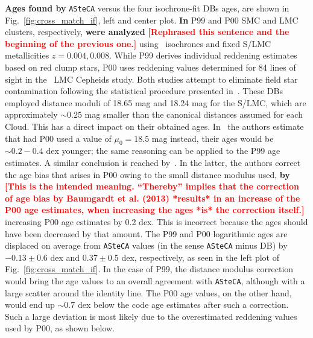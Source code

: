 \documentclass[draft]{aa}
\newcommand{\LEt}[1]{\textcolor{red}{\textbf{[#1]}}}
\begin{document}
%
%
\textbf{Ages found by} \texttt{ASteCA} versus the four isochrone-fit DBs ages,
are shown in Fig.~\ref{fig:cross_match_if}, left and center plot.
%
\textbf{In} P99 and P00 SMC and LMC clusters, respectively, \textbf{were
analyzed} \LEt{Rephrased this sentence and the beginning of the previous one.}
using~\cite{Bertelli_1994} isochrones and fixed S/LMC metallicities
$z{=}0.004, 0.008$. While P99 derives individual reddening estimates based on
red clump stars, P00 uses reddening values determined for 84 lines of sight
in the~\cite{Udalski_1999} LMC Cepheids study.
%
Both studies attempt to eliminate field star contamination following the
statistical procedure presented in~\cite{Mateo_1986}.
These DBs employed distance moduli of 18.65 mag and 18.24 mag for the S/LMC,
which are approximately ${\sim}0.25$ mag smaller than the canonical distances
assumed for each Cloud. This has a direct impact on their obtained ages.
%
In~\cite{de_Grijs_2006} the authors estimate that had P00 used a value
of $\mu_0{=}18.5$ mag instead, their ages would be ${\sim}0.2{-}0.4$
dex younger; the same reasoning can be applied to the P99 age estimates.
A similar conclusion is reached by~\cite{Baumgardt_2013}.
In the latter, the authors correct the age bias that arises in P00 owing to the
small distance modulus used, \textbf{by} \LEt{This is the intended
meaning. ``Thereby'' implies that the correction of age bias by Baumgardt et al.
(2013) *results* in an increase of the P00 age estimates, when increasing the ages
*is* the correction itself.} increasing P00 age estimates by 0.2 dex. This is
incorrect because the ages should have been decreased by that amount. 
%
The P99 and P00 logarithmic ages are displaced on average from \texttt{ASteCA}
values (in the sense \texttt{ASteCA} minus DB) by $-0.13{\pm}0.6$ dex and $0.37
{\pm}0.5$ dex, respectively, as seen in the left plot of Fig.~\ref{fig:cross_match_if}.
In the case of P99, the distance modulus correction would bring the age values
to an overall agreement with \texttt{ASteCA}, although with a large scatter
around the identity line.
%
The P00 age values, on the other hand, would end up ${\sim}0.7$ dex below the code
age estimates  after such a correction. Such a large deviation is most likely due
to the overestimated reddening values used by P00, as shown below.
\end{document}
